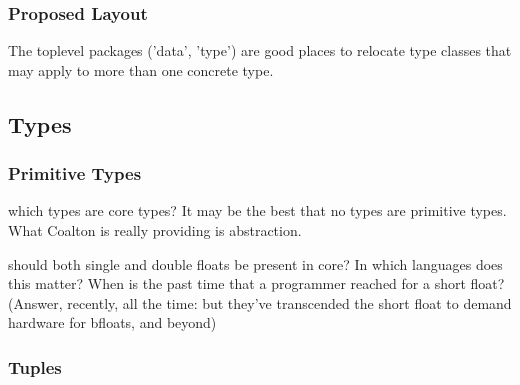 \documentclass[12pt]{article}
\begin{document}
\subsubsection{Proposed Layout}

\begin{itemize}
\item coalton
\item coalton/class
\item coalton/class/iterator, monad
\item coalton/class/monad
\item coalton/data
\item coalton/data/array, hash, list, map, queue, seq, tree, tuple, vector
\item coalton/function
\item coalton/math
\item coalton/mutable
\item coalton/sys
\item coalton/sys/{file
\item coalton/type
\item coalton/type/bit, byte, char, string
\end {itemize}

The toplevel packages ('data', 'type') are good places to relocate
type classes that may apply to more than one concrete type.

\subsection{Types}

\subsubsection{Primitive Types}

which types are core types? It may be the best that no types are
primitive types. What Coalton is really providing is abstraction.

should both single and double floats be present in core? In which
languages does this matter? When is the past time that a programmer
reached for a short float? (Answer, recently, all the time: but
they've transcended the short float to demand hardware for bfloats,
and beyond)

\subsubsection{Tuples}
\end{document}
